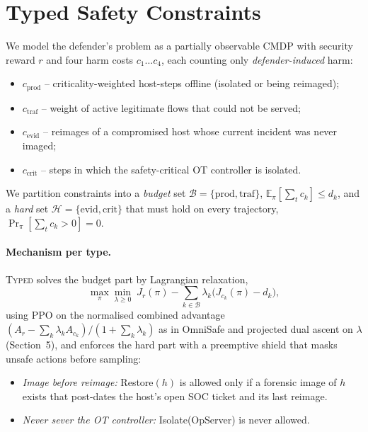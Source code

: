 \documentclass[10pt]{article}
\newcommand{\typed}{\textsc{Typed}}
\begin{document}
\section{Typed Safety Constraints}
We model the defender's problem as a partially observable CMDP with security
reward $r$ and four harm costs $c_1\dots c_4$, each counting only
\emph{defender-induced} harm:
\begin{itemize}
\item $c_{\text{prod}}$ -- criticality-weighted host-steps offline (isolated or being reimaged);
\item $c_{\text{traf}}$ -- weight of active legitimate flows that could not be served;
\item $c_{\text{evid}}$ -- reimages of a compromised host whose current incident was never imaged;
\item $c_{\text{crit}}$ -- steps in which the safety-critical OT controller is isolated.
\end{itemize}
We partition constraints into a \emph{budget} set $\mathcal{B}=\{\text{prod},\text{traf}\}$,
$\mathbb{E}_\pi[\sum_t c_k]\le d_k$, and a \emph{hard} set
$\mathcal{H}=\{\text{evid},\text{crit}\}$ that must hold on every trajectory,
$\Pr_\pi[\sum_t c_k>0]=0$.

\paragraph{Mechanism per type.}
\typed{} solves the budget part by Lagrangian relaxation,
\begin{equation}
\max_\pi \min_{\lambda\ge 0}\; J_r(\pi)-\sum_{k\in\mathcal{B}}\lambda_k\bigl(J_{c_k}(\pi)-d_k\bigr),
\end{equation}
using PPO \citep{schulman2017ppo} on the normalised combined advantage
$(A_r-\sum_k\lambda_k A_{c_k})/(1+\sum_k\lambda_k)$ as in OmniSafe
\citep{ji2024omnisafe} and projected dual ascent on $\lambda$ (Section~5), and enforces the hard part
with a preemptive shield that masks unsafe actions before sampling:
\begin{itemize}
\item[\textbf{H1}] \emph{Image before reimage:} \textsf{Restore}$(h)$ is
allowed only if a forensic image of $h$ exists that post-dates the host's open
SOC ticket and its last reimage.
\item[\textbf{H2}] \emph{Never sever the OT controller:} \textsf{Isolate}(OpServer) is never allowed.
\end{itemize}
\end{document}

